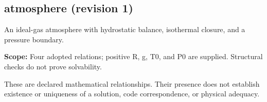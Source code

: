 \subsection*{atmosphere (revision 1)}
An ideal-gas atmosphere with hydrostatic balance, isothermal closure, and a pressure boundary.

\noindent\textbf{Scope:} Four adopted relations; positive R, g, T0, and P0 are supplied. Structural checks do not prove solvability.

These are declared mathematical relationships. Their presence does not establish
existence or uniqueness of a solution, code correspondence, or physical adequacy.

